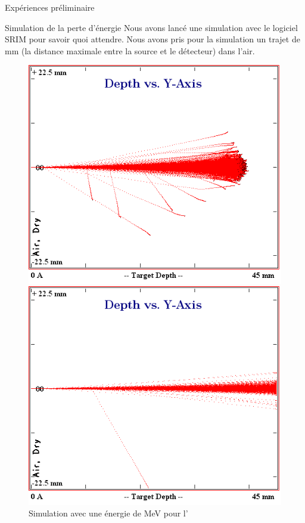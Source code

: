 \documentclass[a4paper,11pt]{scrartcl}
\begin{document}
\begin{section}{Expériences préliminaire}
  \begin{subsection}{Simulation de la perte d'énergie}
   Nous avons lancé une simulation avec le logiciel \flqq SRIM \frqq pour savoir quoi attendre. Nous avons pris pour la simulation un trajet de \unit[45]{mm} (la distance maximale entre la source et le détecteur) dans l'air.
   \begin{figure}[H]
    \begin{minipage}{0.45\textwidth}
     \includegraphics[width=\textwidth]{Bilder/simam.png}
     \caption{Simulation avec une énergie de \unit[5]{MeV} pour l'}
    \end{minipage}
    \hfill
    \begin{minipage}{0.45\textwidth}
     \includegraphics[width=\textwidth]{Bilder/simbi7MeV.png}

\end{minipage}
\end{figure}
\end{subsection}
\end{section}
\end{document}
